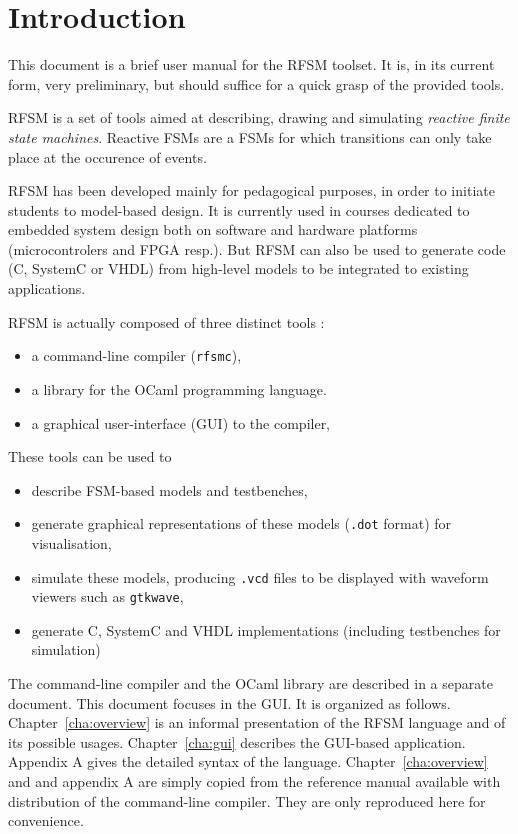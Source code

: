 \chapter{Introduction}
\label{chap:intro}

This document is a brief user manual for the RFSM toolset. It is, in its current form, very
preliminary, but should suffice for a quick grasp of the provided tools. 

\medskip
RFSM is a set of tools aimed at describing, drawing and simulating \emph{reactive finite state
  machines}. Reactive FSMs are a FSMs for which transitions can only take place at the occurence of
events.

\medskip
RFSM has been developed mainly for pedagogical purposes, in order to initiate students to
model-based design. It is currently used in courses dedicated to embedded system design both on
software and hardware platforms (microcontrolers and FPGA resp.). But RFSM can also be used to
generate code (C, SystemC or VHDL) from high-level models to be integrated to existing applications.

\medskip
RFSM is actually composed of three distinct tools :
\begin{itemize}
\item a command-line compiler (\texttt{rfsmc}),
\item a library for the OCaml programming language.
\item a graphical user-interface (GUI) to the compiler, 
\end{itemize}

These tools can be used to
\begin{itemize}
\item describe FSM-based models and testbenches,
\item generate graphical representations of these models (\verb|.dot| format) for visualisation,
\item simulate these models, producing \verb|.vcd| files to be displayed with waveform viewers such
  as \texttt{gtkwave},
\item generate C, SystemC and VHDL implementations (including testbenches for simulation)
\end{itemize}

\medskip
The command-line compiler and the OCaml library are described in a separate document. This document
focuses in the GUI. It is organized as follows.
Chapter~\ref{cha:overview} is an informal presentation of the RFSM language and of its
possible usages. Chapter~\ref{cha:gui} describes the GUI-based application. Appendix A 
gives the detailed syntax of the language.
Chapter~\ref{cha:overview} and and appendix A are simply copied from the reference manual available
with distribution of the command-line compiler. They are only reproduced here for convenience.

